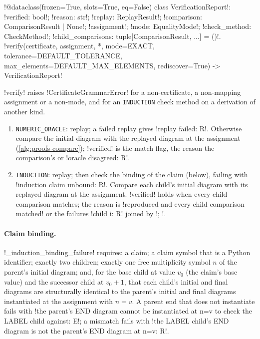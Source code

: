 \begin{signature}
\py!@dataclass(frozen=True, slots=True, eq=False) class VerificationReport!: \py!verified: bool!; \py!reason: str!; \py!replay: ReplayResult!; \py!comparison: ComparisonResult | None!; \py!assignment!; \py!mode: EqualityMode!; \py!check_method: CheckMethod!; \py!child_comparisons: tuple[ComparisonResult, ...] = ()!.\\
\py!verify(certificate, assignment, *, mode=EXACT, tolerance=DEFAULT_TOLERANCE, max_elements=DEFAULT_MAX_ELEMENTS, rediscover=True) -> VerificationReport!
\end{signature}

\py!verify! raises \py!CertificateGrammarError! for a non-certificate, a non-mapping assignment or a non-mode, and for an \texttt{INDUCTION} check method on a derivation of another kind.

\begin{algorithm}[Verification]\label{alg:proofs-verify}
\leavevmode
\begin{enumerate}
\item \texttt{NUMERIC\_ORACLE}: replay; a failed replay gives \code!replay failed: R!. Otherwise compare the initial diagram with the replayed diagram at the assignment (\cref{alg:proofs-compare}); \py!verified! is the match flag, the reason the comparison's or \code!oracle disagreed: R!.
\item \texttt{INDUCTION}: replay; then check the binding of the claim (below), failing with \code!induction claim unbound: R!. Compare each child's initial diagram with its replayed diagram at the assignment. \py!verified! holds when every child comparison matches; the reason is \code!reproduced and every child comparison matched! or the failures \code!child i: R! joined by \code!; !.
\end{enumerate}
\end{algorithm}

\paragraph{Claim binding.} \py!_induction_binding_failure! requires: a claim; a claim symbol that is a Python identifier; exactly two children; exactly one free multiplicity symbol $n$ of the parent's initial diagram; and, for the base child at value $v_0$ (the claim's base value) and the successor child at $v_0+1$, that each child's initial and final diagrams are structurally identical to the parent's initial and final diagrams instantiated at the assignment with $n=v$. A parent end that does not instantiate fails with \code!the parent's END diagram cannot be instantiated at n=v to check the LABEL child against: E!; a mismatch fails with \code!the LABEL child's END diagram is not the parent's END diagram at n=v: R!.

